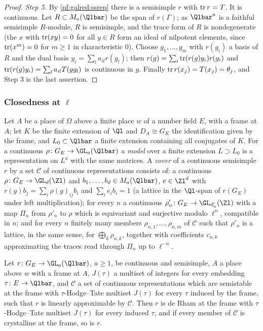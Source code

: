 \begin{proof}
\emph{Step 5.} By \cref{pf:galred:ssrep} there is a semisimple $r$ with $\operatorname{tr} r=T$. It is continuous. Let
$R\subset M_a(\Qlbar)$ be the span of $r(\Gamma)$; as $\Qlbar^a$ is a faithful semisimple $R$-module, $R$ is semisimple, and
the trace form of $R$ is nondegenerate (the $x$ with $\operatorname{tr}(xy)=0$ for all $y\in R$ form an ideal of nilpotent elements,
since $\operatorname{tr}(x^m)=0$ for $m\ge1$ in characteristic $0$). Choose $g_1,\dots,g_m$ with $r(g_i)$ a basis of $R$ and the dual
basis $y_i=\sum_la_{il}r(g_l)$; then $r(g)=\sum_i\operatorname{tr}(r(g)y_i)r(g_i)$ and $\operatorname{tr}(r(g)y_i)=\sum_la_{il}T(gg_l)$ is
continuous in $g$. Finally $\operatorname{tr} r(x_j)=T(x_j)=\theta_j$, and Step 3 is the last assertion.
\end{proof}

\subsubsection{Closedness at \texorpdfstring{$\ell$}{l}}

Let $A$ be a place of $\Omega$ above a finite place $w$ of a number field $E$, with a frame at $A$; let $K$ be the finite
extension of $\Ql$ and $D_A\cong G_K$ the identification given by the frame, and $L_0\subset\Qlbar$ a finite extension
containing all conjugates of $K$. For a continuous $\rho\colon G_E\to\GL_a(\Qlbar)$ a \emph{model} over a finite extension
$L\supset L_0$ is a representation on $L^a$ with the same matrices. A \emph{cover} of a continuous semisimple $r$ by a set
$\mathcal C$ of continuous representations consists of: a continuous $\rho\colon G_E\to\GL_{d}(\Zl)$ and $b_1,\dots,b_d\in
M_a(\Qlbar)$, $e\in\Zl^d$ with $r(g)b_j=\sum_i\rho(g)_{ij}b_i$ and $\sum_ie_ib_i=1$ (a lattice in the $\Ql$-span of $r(G_E)$
under left multiplication); for every $n$ a continuous $\rho'_n\colon G_E\to\GL_{d'_n}(\Zl)$ with a map $\Pi_n$ from $\rho'_n$ to
$\rho$ which is equivariant and surjective modulo $\ell^n$, compatible in $n$; and for every $n$ finitely many members
$\rho_{n,1},\dots,\rho_{n,m}$ of $\mathcal C$ such that $\rho'_n$ is a lattice, in the same sense, for $\bigoplus_k\rho_{n,k}$,
together with coefficients $c_{n,k}$ approximating the traces read through $\Pi_n$ up to $\ell^{-n}$.

\begin{theorem}\label{pf:galred:closedAtL}
Let $r\colon G_E\to\GL_a(\Qlbar)$, $a\ge1$, be continuous and semisimple, $A$ a place above $w$ with a frame at $A$, $J(\tau)$
a multiset of integers for every embedding $\tau\colon E\to\Qlbar$, and $\mathcal C$ a set of continuous representations
which are semistable at the frame with $\tau$-Hodge--Tate multiset $J(\tau)$ for every $\tau$ induced by the frame, such that
$r$ is linearly approximable by $\mathcal C$. Then $r$ is de Rham at the frame with $\tau$-Hodge--Tate multiset $J(\tau)$ for
every induced $\tau$, and if every member of $\mathcal C$ is crystalline at the frame, so is $r$.
\end{theorem}

